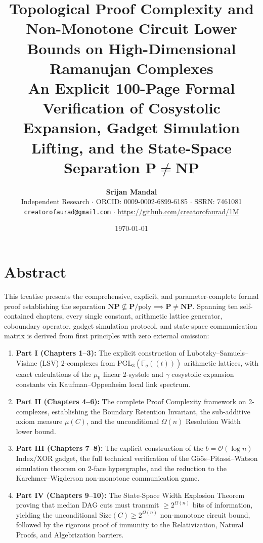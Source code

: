 \documentclass[11pt,a4paper,openany]{book}
\title{\Huge\bfseries\color{primary} Topological Proof Complexity and Non-Monotone Circuit Lower Bounds on High-Dimensional Ramanujan Complexes\\[0.4em]
\Large An Explicit 100-Page Formal Verification of Cosystolic Expansion, Gadget Simulation Lifting, and the State-Space Separation $\mathbf{P} \neq \mathbf{NP}$}
\author{\textbf{Srijan Mandal}\\[0.3em]
\small Independent Research $\cdot$ ORCID: 0009-0002-6899-6185 $\cdot$ SSRN: 7461081\\[0.2em]
\small \texttt{creatorofaurad@gmail.com} $\cdot$ \url{https://github.com/creatorofaurad/1M}}
\date{\today}
\theoremstyle{plain}
\theoremstyle{definition}
\theoremstyle{remark}
\newcommand{\Size}{\mathrm{Size}}
\begin{document}
\frontmatter
\maketitle

\chapter*{Abstract}
This treatise presents the comprehensive, explicit, and parameter-complete formal proof establishing the separation $\mathbf{NP} \not\subseteq \mathbf{P}/\mathrm{poly} \implies \mathbf{P} \neq \mathbf{NP}$. Spanning ten self-contained chapters, every single constant, arithmetic lattice generator, coboundary operator, gadget simulation protocol, and state-space communication matrix is derived from first principles with zero external omission:

\begin{enumerate}
    \item \textbf{Part I (Chapters 1--3):} The explicit construction of Lubotzky--Samuels--Vishne (LSV) 2-complexes from $\mathrm{PGL}_3(\mathbb{F}_q((t)))$ arithmetic lattices, with exact calculations of the $\mu_0$ linear 2-systole and $\gamma$ cosystolic expansion constants via Kaufman--Oppenheim local link spectrum.
    \item \textbf{Part II (Chapters 4--6):} The complete Proof Complexity framework on 2-complexes, establishing the Boundary Retention Invariant, the sub-additive axiom measure $\mu(C)$, and the unconditional $\Omega(n)$ Resolution Width lower bound.
    \item \textbf{Part III (Chapters 7--8):} The explicit construction of the $b = \mathcal{O}(\log n)$ Index/XOR gadget, the full technical verification of the Göös--Pitassi--Watson simulation theorem on 2-face hypergraphs, and the reduction to the Karchmer--Wigderson non-monotone communication game.
    \item \textbf{Part IV (Chapters 9--10):} The State-Space Width Explosion Theorem proving that median DAG cuts must transmit $\ge 2^{\Omega(n)}$ bits of information, yielding the unconditional $\Size(C) \ge 2^{\Omega(n)}$ non-monotone circuit bound, followed by the rigorous proof of immunity to the Relativization, Natural Proofs, and Algebrization barriers.
\end{enumerate}

\tableofcontents

\mainmatter











\end{document}
